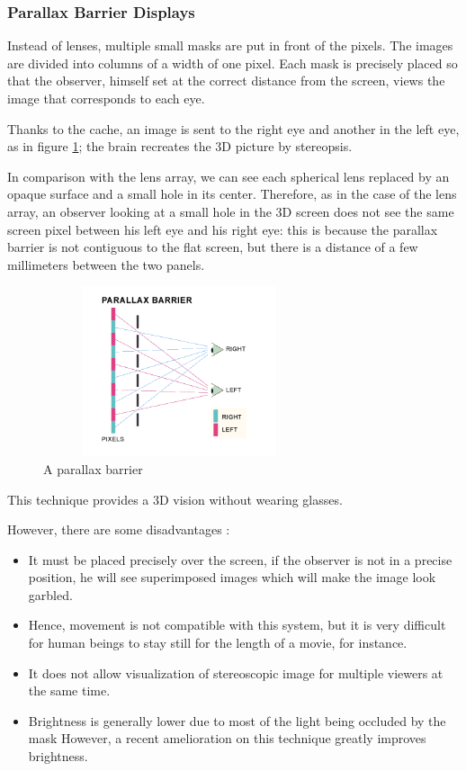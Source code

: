 \subsubsection{Parallax Barrier Displays}
Instead of lenses, multiple small masks are put in front of the pixels. The images are divided into columns of a width of one pixel.
Each mask is precisely placed so that the observer, himself set at the correct distance from the screen, views the image that corresponds to each eye. 

Thanks to the cache, an image is sent to the right eye and another in the left eye, as in figure \ref{fig:paraba}; the brain recreates the 3D picture by stereopsis.

In comparison with the lens array, we can see each spherical lens replaced by an opaque surface and a small hole in its center. Therefore, as in the case of the lens array, an observer looking at a small hole in the 3D screen does not see the same screen pixel between his left eye and his right eye: this is because the parallax barrier is not contiguous to the flat screen, but there is a distance of a few millimeters between the two panels.

\begin{figure}[h!]
\centering\includegraphics[width=8cm,height=5cm]{image/parallax.png}
\caption{A parallax barrier}
\label{fig:paraba}
\end{figure}

This technique provides a 3D vision without wearing glasses.

However, there are some disadvantages :
\begin{itemize}
\item It must be placed precisely over the screen, if the observer is not in a precise position, he will see superimposed images which will make the image look garbled.
\item Hence, movement is not compatible with this system, but it is very difficult for human beings to stay still for the length of a movie, for instance.
\item It does not allow visualization of stereoscopic image for multiple viewers at the same time.
\item Brightness is generally lower due to most of the light being occluded by the mask However, a recent amelioration on this technique greatly improves brightness\cite{lv2014shared}.
\end{itemize}

